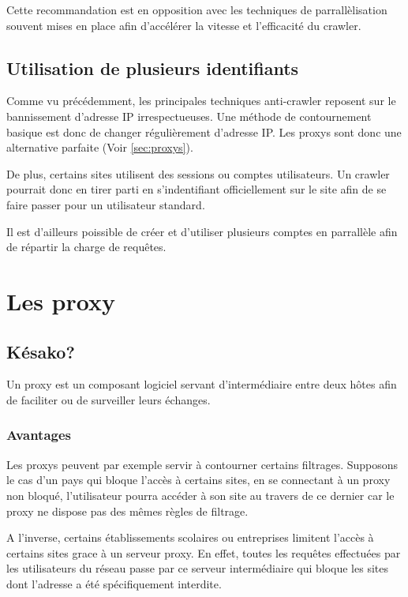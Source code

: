 \documentclass[hideweeklyreports,noposter]{polytech/polytech}
\begin{document}
            Cette recommandation est en opposition avec les techniques de parrallèlisation souvent mises en place afin d'accélérer la vitesse et l'efficacité du crawler.
            
		
		\section{Utilisation de plusieurs identifiants}
			Comme vu précédemment, les principales techniques anti-crawler reposent sur le bannissement d'adresse IP irrespectueuses.
			Une méthode de contournement basique est donc de changer régulièrement d'adresse IP.
			Les proxys sont donc une alternative parfaite (Voir \autoref{sec:proxys}).



			De plus, certains sites utilisent des sessions ou comptes utilisateurs.
			Un crawler pourrait donc en tirer parti en s'indentifiant officiellement sur le site afin de se faire passer pour un utilisateur standard.

			Il est d'ailleurs poissible de créer et d'utiliser plusieurs comptes en parrallèle afin de répartir la charge de requêtes.

	\chapter{Les proxy\label{sec:proxys}}
		\section{Késako?}
			Un proxy est un composant logiciel servant d'intermédiaire entre deux hôtes afin de faciliter ou de surveiller leurs échanges.
			
			
			\subsection{Avantages}
				Les proxys peuvent par exemple servir à contourner certains filtrages.
				Supposons le cas d'un pays qui bloque l'accès à certains sites, en se connectant à un proxy non bloqué, l'utilisateur pourra accéder à son site au travers de ce dernier car le proxy ne dispose pas des mêmes règles de filtrage.
				
				A l'inverse, certains établissements scolaires ou entreprises limitent l'accès à certains sites grace à un serveur proxy. En effet, toutes les requêtes effectuées par les utilisateurs du réseau passe par ce serveur intermédiaire qui bloque les sites dont l'adresse a été spécifiquement interdite.
				
\end{document}
